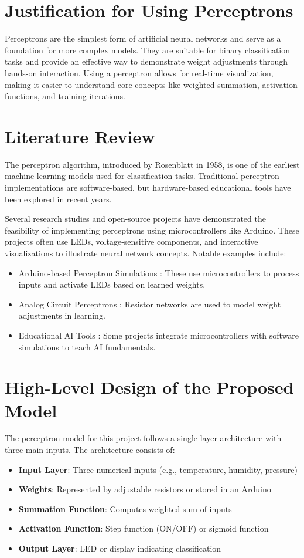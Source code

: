 \documentclass{article}
\begin{document}
\section{Justification for Using Perceptrons}
Perceptrons are the simplest form of artificial neural networks and serve as a foundation for more complex models. They are suitable for binary classification tasks and provide an effective way to demonstrate weight adjustments through hands-on interaction. Using a perceptron allows for real-time visualization, making it easier to understand core concepts like weighted summation, activation functions, and training iterations.

\section{Literature Review}
The perceptron algorithm, introduced by Rosenblatt in 1958, is one of the earliest machine learning models used for classification tasks. Traditional perceptron implementations are software-based, but hardware-based educational tools have been explored in recent years. 

Several research studies and open-source projects have demonstrated the feasibility of implementing perceptrons using microcontrollers like Arduino. These projects often use LEDs, voltage-sensitive components, and interactive visualizations to illustrate neural network concepts. Notable examples include:

\begin{itemize}
    \item Arduino-based Perceptron Simulations : These use microcontrollers to process inputs and activate LEDs based on learned weights.
    \item Analog Circuit Perceptrons : Resistor networks are used to model weight adjustments in learning.
    \item Educational AI Tools : Some projects integrate microcontrollers with software simulations to teach AI fundamentals.
\end{itemize}

\section{High-Level Design of the Proposed Model}

The perceptron model for this project follows a single-layer architecture with three main inputs. The architecture consists of:

\begin{itemize}
    \item \textbf{Input Layer}: Three numerical inputs (e.g., temperature, humidity, pressure)
    \item \textbf{Weights}: Represented by adjustable resistors or stored in an Arduino
    \item \textbf{Summation Function}: Computes weighted sum of inputs
    \item \textbf{Activation Function}: Step function (ON/OFF) or sigmoid function
    \item \textbf{Output Layer}: LED or display indicating classification
\end{itemize}
\end{document}
